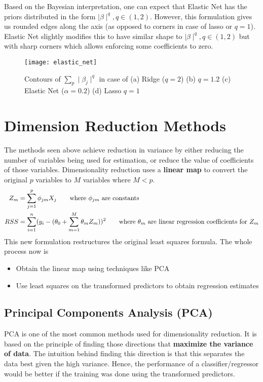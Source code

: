 \documentclass[../statistical_learning_notes.tex]{subfiles}
\begin{document}
    Based on the Bayesian interpretation, one can expect that Elastic Net has the priors distributed in the form $\mid \beta \mid ^{q}, q \in (1,2)$. However, this formulation gives us rounded edges along the axis (as opposed to corners in case of lasso or $q=1$). Elastic Net slightly modifies this to have similar shape to $\mid \beta \mid ^{q}, q \in (1,2)$ but with sharp corners which allows enforcing some coefficients to zero.


    \begin{figure}[h]
        \texttt{[image: elastic\_net]}
        \centering
        \caption {Contours of $\sum_{p} \mid \beta_{j} \mid^{q}$ in case of (a) Ridge ($q=2$) (b) $q=1.2$ (c) Elastic Net ($\alpha=0.2$) (d) Lasso $q=1$}
        \label{fig:elastic_net}%
    \end{figure}


    \section{Dimension Reduction Methods}
    The methods seen above achieve reduction in variance by either reducing the number of variables being used for estimation, or reduce the value of coefficients of those variables.\newline
    Dimensionality reduction uses a \textbf{linear map} to convert the original $p$ variables to $M$ variables where $M < p$.
    \begin{align*}
        Z_{m} &= \sum_{j=1}^{p} \phi_{jm}X_{j} \tag*{where $\phi_{jm}$ are constants} \\
        RSS &= \sum_{i=1}^{n} (y_{i} - (\theta_{0}+\sum_{m=1}^{M}\theta_{m}Z_{m}))^{2} \tag*{where $\theta_{m}$ are linear regression coefficients for $Z_{m}$}
    \end{align*}
    This new formulation restructures the original least squares formula. The whole process now is
    \begin{itemize}
        \item Obtain the linear map using techniques like PCA
        \item Use least squares on the transformed predictors to obtain regression estimates
    \end{itemize}


    \subsection{Principal Components Analysis (PCA)}
    PCA is one of the most common methods used for dimensionality reduction. It is based on the principle of finding those directions that \textbf{maximize the variance of data}. The intuition behind finding this direction is that this separates the data best given the high variance. Hence, the performance of a classifier/regressor would be better if the training was done using the transformed predictors. \newline
\end{document}
